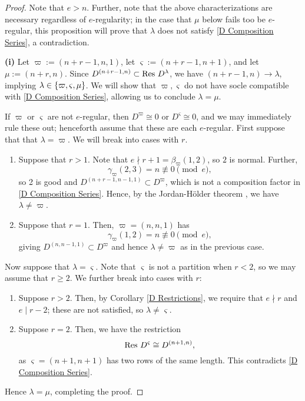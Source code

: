 \documentclass{amsart}
\begin{document}
  \begin{proof}
    Note that $e > n$.
    Further, note that the above characterizations are necessary regardless of $e$-regularity;
    in the case that $\mu$ below fails too be $e$-regular, this proposition will prove that $\lambda$ does not satisfy \ref{D Composition Series}, a contradiction.

    \textbf{(i)}
    Let $\varpi := (n+r-1,n,1)$, let $\varsigma := (n+r-1,n+1)$, and let $\mu := (n + r,n)$.
    Since $D^{(n+r-1,n)} \subset \operatorname{Res} \, D^\lambda$, we have $(n + r - 1,n) \longrightarrow \lambda$, implying $\lambda \in \left\{ \varpi,\varsigma,\mu \right\}$.
    We will show that $\varpi, \varsigma$ do not have socle compatible with \eqref{D Composition Series}, allowing us to conclude $\lambda = \mu$.
    
    If $\varpi$ or $\varsigma$ are not $e$-regular, then $D^\varpi \cong 0$ or $D^\varsigma \cong 0$, and we may immediately rule these out;
    henceforth assume that these are each $e$-regular.
    First suppose that that $\lambda = \varpi$.
    We will break into cases with $r$.
    \begin{enumerate}[label={\textit{Case \arabic*.}}]
      \item Suppose that $r > 1$.
        Note that $e \nmid r + 1 = \beta_\varpi(1,2)$, so $2$ is normal.
        Further, \[\gamma_\varpi(2,3) = n \not\equiv 0 \pmod e,\] so 2 is good and $D^{(n+r-1,n-1,1)} \subset D^\varpi$, which is not a composition factor in \eqref{D Composition Series}.
        Hence, by the Jordan-H\"older theorem \cite[Thm.~3.7.1]{Etingof}, we have $\lambda \neq \varpi$.

      \item Suppose that $r = 1$.
        Then, $\varpi = (n,n,1)$ has \[\gamma_{\varpi}(1,2) = n \not\equiv 0 \pmod e,\] giving $D^{(n,n-1,1)} \subset D^\varpi$ and hence $\lambda \neq \varpi$ as in the previous case.
    \end{enumerate} 

  \vspace{5pt}
  Now suppose that $\lambda = \varsigma$.
  Note that $\varsigma$ is not a partition when $r < 2$, so we may assume that $r \geq 2$.
  We further break into cases with $r$:
  \begin{enumerate}[label={\textit{Case \arabic*.}}]
    \item Suppose $r > 2$.
      Then, by Corollary \ref{D Restrictions}, we require that $e \nmid r$ and $e \mid r - 2$;
      these are not satisfied, so $\lambda \neq \varsigma$.
    \item Suppose $r = 2$.
      Then, we have the restriction \[\operatorname{Res} \, D^\varsigma \cong D^{(n+1,n)},\] as $\varsigma = (n+1,n+1)$ has two rows of the same length.
      This contradicts \eqref{D Composition Series}. 
  \end{enumerate}
  Hence $\lambda = \mu$, completing the proof.


\end{proof}
\end{document}
